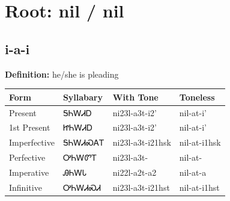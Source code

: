 \documentclass{article}%
\begin{document}
%
\normalsize%
\section*{Root: nil / nil}%
\subsection*{i-a-i}%
\textbf{Definition: }%
he/she is pleading%
\\[0.5em]%
\begin{tabular}{|l|l|l|l|}%
\hline%
\textbf{Form}&\textbf{Syllabary}&\textbf{With Tone}&\textbf{Toneless}\\%
\hline%
Present&ᎦᏂᎳᏗᎠ&ni23l{-}a3t{-}i2'&nil{-}at{-}i'\\%
1st Present&ᏥᏂᎳᏗᎠ&ni23l{-}a3t{-}i2'&nil{-}at{-}i'\\%
Imperfective&ᎦᏂᎳᏗᏍᎪᎢ&ni23l{-}a3t{-}i21hsk&nil{-}at{-}i1hsk\\%
Perfective&ᎤᏂᎳᏛᎢ&ni23l{-}a3t{-}&nil{-}at{-}\\%
Imperative&ᎯᏂᎳᏓ&ni22l{-}a2t{-}a2&nil{-}at{-}a\\%
Infinitive&ᎤᏂᎳᏗᏍᏗ&ni23l{-}a3t{-}i21hst&nil{-}at{-}i1hst\\%
\hline%
\end{tabular}%
\\[1em]%
\end{document}
